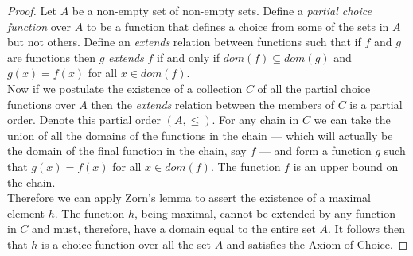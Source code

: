 \documentclass[../MathsNotesBase.tex]{subfiles}
\begin{document}
{		
		\begin{tcolorbox}[breakable,enhanced jigsaw,colframe=white,colback=white,boxrule=0pt,arc=0pt,left=0pt,right=0pt,top=0pt,bottom=0pt]
		\begin{proof}
			Let $A$ be a non-empty set of non-empty sets. Define a \textit{partial choice function} over $A$ to be a function that defines a choice from some of the sets in $A$ but not others. Define an \textit{extends} relation between functions such that if $f$ and $g$ are functions then $g$ \textit{extends} $f$ if and only if ${ dom(f) \subseteq dom(g) }$ and ${ g(x) = f(x) }$ for all ${ x \in dom(f). }$\\
			Now if we postulate the existence of a collection $C$ of all the partial choice functions over $A$ then the \textit{extends} relation between the members of $C$ is a partial order. Denote this partial order ${ (A, \leq) }$.
			For any chain in $C$ we can take the union of all the domains of the functions in the chain --- which will actually be the domain of the final function in the chain, say $f$ --- and form a function $g$ such that ${ g(x) = f(x) }$ for all ${ x \in dom(f) }$. The function $f$ is an upper bound on the chain.\\
			Therefore we can apply Zorn's lemma to assert the existence of a maximal element $h$. The function $h$, being maximal, cannot be extended by any function in $C$ and must, therefore, have a domain equal to the entire set $A$. It follows then that $h$ is a choice function over all the set $A$ and satisfies the Axiom of Choice.
		\end{proof}
		\end{tcolorbox}

}
\end{document}
